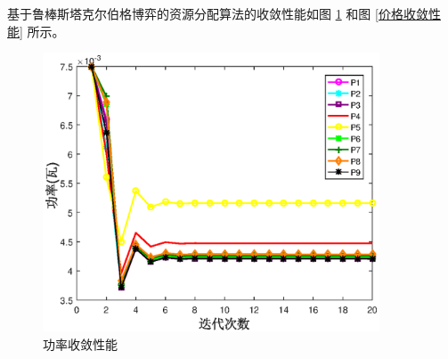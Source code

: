 基于鲁棒斯塔克尔伯格博弈的资源分配算法的收敛性能如图 \ref{功率收敛性能} 和图 \ref{价格收敛性能} 所示。
\begin{figure}[H]
\centering
\includegraphics[width=10cm]{figures//chap2//功率.eps}
\caption{功率收敛性能}
\label{功率收敛性能}
\end{figure}

